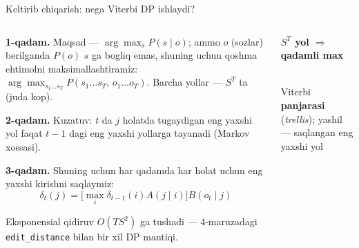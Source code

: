 \documentclass[aspectratio=169,11pt]{beamer}
\newcommand{\uzq}{\textquotesingle{}}
\begin{document}
\begin{frame}{Keltirib chiqarish: nega Viterbi DP ishlaydi?}
\footnotesize

\begin{columns}[T,totalwidth=\textwidth]
\begin{column}{0.62\textwidth}
\textbf{1-qadam.} Maqsad --- $\arg\max_{s} P(s\mid o)$; ammo $o$ (so\uzq{}zlar)
berilganda $P(o)$ $s$ ga bog\uzq{}liq emas, shuning uchun qo\uzq{}shma ehtimolni
maksimallashtiramiz:
$\displaystyle \arg\max_{s_1\dots s_T} P(s_1\dots s_T,\, o_1\dots o_T)$.
Barcha yo\uzq{}llar --- $S^{T}$ ta (juda ko\uzq{}p).

\vspace{3pt}
\textbf{2-qadam.} Kuzatuv: $t$ da $j$ holatda tugaydigan eng yaxshi yo\uzq{}l faqat
$t{-}1$ dagi eng yaxshi yo\uzq{}llarga tayanadi (Markov xossasi).

\vspace{3pt}
\textbf{3-qadam.} Shuning uchun har qadamda har holat uchun eng yaxshi kirishni saqlaymiz:
\[
\delta_t(j)=\Big[\max_{i}\delta_{t-1}(i)A(j\mid i)\Big]B(o_t\mid j)
\]

\vspace{2pt}
Eksponensial qidiruv $O(TS^{2})$ ga tushadi --- 4-ma\uzq{}ruzadagi
\texttt{edit\_distance} bilan bir xil DP mantiqi.
\end{column}

\begin{column}{0.36\textwidth}
\centering
{\scriptsize \textbf{$S^{T}$ yo\uzq{}l $\Rightarrow$ qadamli max}}\\[3pt]
\\[2pt]
{\scriptsize Viterbi \textbf{panjarasi} (\textit{trellis}); yashil --- saqlangan
eng yaxshi yo\uzq{}l}
\end{column}
\end{columns}

\end{frame}
\end{document}
